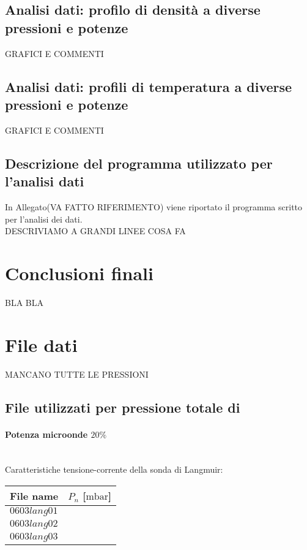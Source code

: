 \subsection{Analisi dati: profilo di densità a diverse pressioni e potenze}

GRAFICI E COMMENTI
\subsection{Analisi dati: profili di temperatura a diverse pressioni e potenze}

GRAFICI E COMMENTI

\subsection{Descrizione del programma utilizzato per l'analisi dati}
In Allegato(VA FATTO RIFERIMENTO) viene riportato il programma scritto per l'analisi dei dati.\\
DESCRIVIAMO A GRANDI LINEE COSA FA


\section{Conclusioni finali}
BLA BLA

\section{File dati}
MANCANO TUTTE LE PRESSIONI

\subsection{File utilizzati per pressione totale di $   $}

\paragraph*{Potenza microonde $\text{20\%}$} ~\\
Caratteristiche tensione-corrente della sonda di Langmuir:
\begin{center}
\begin{tabular}{p{3cm}p{3cm}}
\toprule
File name	&$P_{n}$ [$\si{\milli\bar}$]\\
\midrule
$0603lang01$	&$   $\\
$0603lang02$	&$   $\\
$0603lang03$	&$   $\\
\bottomrule
\end{tabular}
\end{center}

